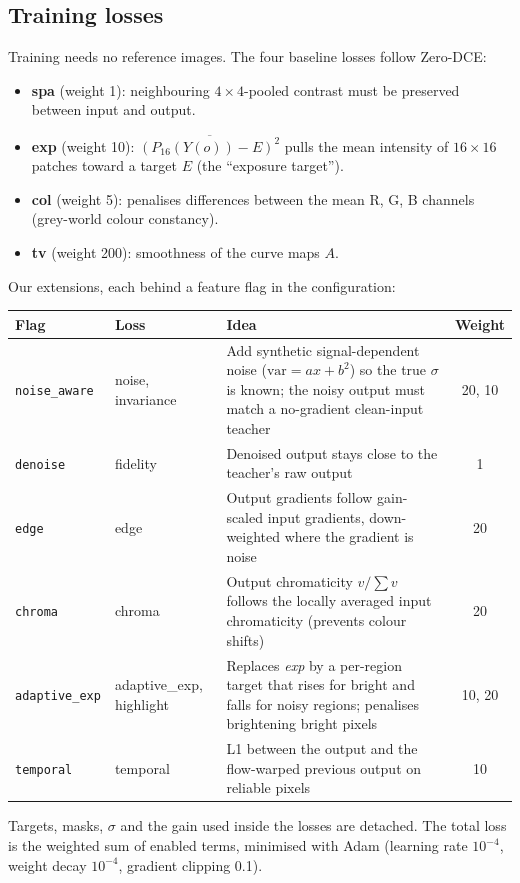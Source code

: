 \documentclass{article}
\newcommand{\code}[1]{\texttt{#1}}
\begin{document}
\subsection{Training losses}
Training needs no reference images. The four baseline losses follow Zero-DCE:
\begin{itemize}[nosep]
  \item \textbf{spa} (weight 1): neighbouring $4\times4$-pooled contrast must be preserved between input and output.
  \item \textbf{exp} (weight 10): $\overline{(P_{16}(Y(o))-E)^2}$ pulls the mean intensity of $16\times16$ patches toward a target $E$ (the ``exposure target'').
  \item \textbf{col} (weight 5): penalises differences between the mean R, G, B channels (grey-world colour constancy).
  \item \textbf{tv} (weight 200): smoothness of the curve maps $A$.
\end{itemize}
Our extensions, each behind a feature flag in the configuration:
\begin{center}
\small
\begin{tabularx}{\linewidth}{@{}ll>{\raggedright\arraybackslash}Xc@{}}
\toprule
Flag & Loss & Idea & Weight\\
\midrule
\code{noise\_aware} & noise, invariance & Add synthetic signal-dependent noise ($\mathrm{var}=ax+b^2$) so the true $\sigma$ is known; the noisy output must match a no-gradient clean-input teacher & 20, 10\\
\code{denoise} & fidelity & Denoised output stays close to the teacher's raw output & 1\\
\code{edge} & edge & Output gradients follow gain-scaled input gradients, down-weighted where the gradient is noise & 20\\
\code{chroma} & chroma & Output chromaticity $v/\sum v$ follows the locally averaged input chromaticity (prevents colour shifts) & 20\\
\code{adaptive\_exp} & adaptive\_exp, highlight & Replaces \emph{exp} by a per-region target that rises for bright and falls for noisy regions; penalises brightening bright pixels & 10, 20\\
\code{temporal} & temporal & L1 between the output and the flow-warped previous output on reliable pixels & 10\\
\bottomrule
\end{tabularx}
\end{center}
Targets, masks, $\sigma$ and the gain used inside the losses are detached. The total loss is the weighted sum of enabled terms, minimised with Adam (learning rate $10^{-4}$, weight decay $10^{-4}$, gradient clipping 0.1).
\end{document}
